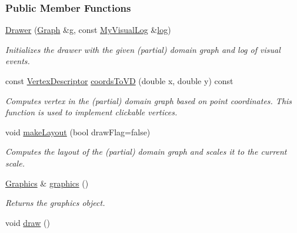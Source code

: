 \subsubsection*{Public Member Functions}
\begin{DoxyCompactItemize}
\item 
\hyperlink{structslb_1_1core_1_1ui_1_1Drawer_a2b36937d5401aa35c7f72aadeaa84af8}{Drawer} (\hyperlink{structslb_1_1core_1_1ui_1_1Drawer_a70000b142df2f4e01123aa4bed5fd3a2}{Graph} \&g, const \hyperlink{structslb_1_1core_1_1ui_1_1Drawer_a1e0ed3482642e5d13e234f83bf690b8a}{My\+Visual\+Log} \&\hyperlink{namespaceslb_1_1core_1_1ui_acdeb0db1847459cac6f4eeb22bbb5998}{log})\hypertarget{structslb_1_1core_1_1ui_1_1Drawer_a2b36937d5401aa35c7f72aadeaa84af8}{}\label{structslb_1_1core_1_1ui_1_1Drawer_a2b36937d5401aa35c7f72aadeaa84af8}

\begin{DoxyCompactList}\small\item\em Initializes the drawer with the given (partial) domain graph and log of visual events. \end{DoxyCompactList}\item 
const \hyperlink{structslb_1_1core_1_1ui_1_1Drawer_a3106bd6b1354ea4a24c3ef169c1e18b8}{Vertex\+Descriptor} \hyperlink{structslb_1_1core_1_1ui_1_1Drawer_addc15f78ae4ec2bd61cdc5d5f61fa97e}{coords\+To\+VD} (double x, double y) const 
\begin{DoxyCompactList}\small\item\em Computes vertex in the (partial) domain graph based on point coordinates. This function is used to implement clickable vertices. \end{DoxyCompactList}\item 
void \hyperlink{structslb_1_1core_1_1ui_1_1Drawer_a9eac7f2468062e47c2ca24e988d74747}{make\+Layout} (bool draw\+Flag=false)
\begin{DoxyCompactList}\small\item\em Computes the layout of the (partial) domain graph and scales it to the current scale. \end{DoxyCompactList}\item 
\hyperlink{structslb_1_1core_1_1ui_1_1Graphics}{Graphics} \& \hyperlink{structslb_1_1core_1_1ui_1_1Drawer_af86e8fb465c1d617ea736012651a82e6}{graphics} ()
\begin{DoxyCompactList}\small\item\em Returns the graphics object. \end{DoxyCompactList}\item 
void \hyperlink{structslb_1_1core_1_1ui_1_1Drawer_a489ab8e47081333e9992a7b9f49222c6}{draw} ()\hypertarget{structslb_1_1core_1_1ui_1_1Drawer_a489ab8e47081333e9992a7b9f49222c6}{}\label{structslb_1_1core_1_1ui_1_1Drawer_a489ab8e47081333e9992a7b9f49222c6}


\end{DoxyCompactItemize}
